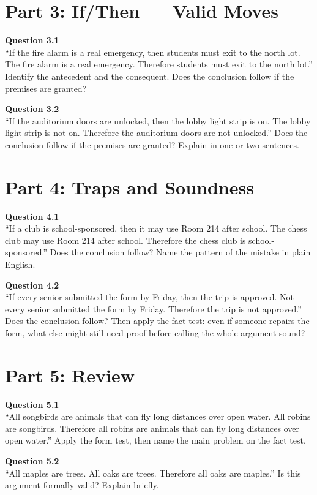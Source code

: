 \documentclass[12pt]{article}
\begin{document}
\section*{Part 3: If/Then --- Valid Moves}

\textbf{Question 3.1}\\[-0.15em]
``If the fire alarm is a real emergency, then students must exit to the north lot. The fire alarm is a real emergency. Therefore students must exit to the north lot.'' Identify the antecedent and the consequent. Does the conclusion follow if the premises are granted?


\textbf{Question 3.2}\\[-0.15em]
``If the auditorium doors are unlocked, then the lobby light strip is on. The lobby light strip is not on. Therefore the auditorium doors are not unlocked.'' Does the conclusion follow if the premises are granted? Explain in one or two sentences.


\newpage

\section*{Part 4: Traps and Soundness}

\textbf{Question 4.1}\\[-0.15em]
``If a club is school-sponsored, then it may use Room 214 after school. The chess club may use Room 214 after school. Therefore the chess club is school-sponsored.'' Does the conclusion follow? Name the pattern of the mistake in plain English.


\textbf{Question 4.2}\\[-0.15em]
``If every senior submitted the form by Friday, then the trip is approved. Not every senior submitted the form by Friday. Therefore the trip is not approved.'' Does the conclusion follow? Then apply the fact test: even if someone repairs the form, what else might still need proof before calling the whole argument sound?


\newpage

\section*{Part 5: Review}

\textbf{Question 5.1}\\[-0.15em]
``All songbirds are animals that can fly long distances over open water. All robins are songbirds. Therefore all robins are animals that can fly long distances over open water.'' Apply the form test, then name the main problem on the fact test.


\textbf{Question 5.2}\\[-0.15em]
``All maples are trees. All oaks are trees. Therefore all oaks are maples.'' Is this argument formally valid? Explain briefly.

\end{document}
